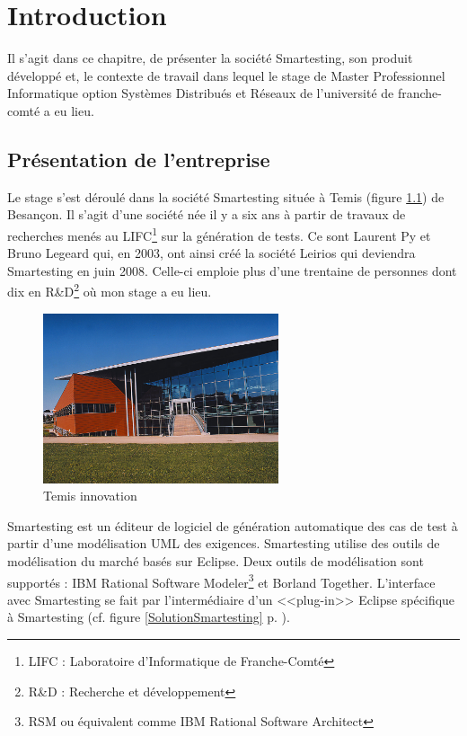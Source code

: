 \chapter{Introduction}

Il s'agit dans ce chapitre, de présenter la société Smartesting, son produit développé et, le contexte de travail dans lequel le stage de Master Professionnel Informatique option Systèmes Distribués et Réseaux de l'université de franche-comté a eu lieu.

\section{Présentation de l'entreprise}

Le stage s’est déroulé dans la société Smartesting située à Temis (figure \ref{Temis}) de Besançon. Il s'agit d'une société née il y a six ans à partir de travaux de recherches menés au LIFC\footnote{LIFC : Laboratoire d'Informatique de Franche-Comté} sur la génération de tests. 
Ce sont Laurent Py et Bruno Legeard qui, en 2003, ont ainsi créé la société Leirios qui deviendra  Smartesting en juin 2008.
Celle-ci emploie plus d'une trentaine de personnes dont dix en R\&D\footnote{R\&D : Recherche et développement} où mon stage a eu lieu.

\begin{figure}[!ht]
\begin{center}
  \includegraphics[height=5cm]{images/temis.jpg}
  \caption{Temis innovation}
  \label{Temis}
\end{center}
\end{figure}

Smartesting est un éditeur de logiciel de génération automatique des cas de test à partir d'une modélisation UML des exigences. Smartesting utilise des outils de modélisation du marché basés sur Eclipse. Deux outils de modélisation sont supportés : IBM Rational Software Modeler\footnote{RSM ou équivalent comme IBM Rational Software Architect} et Borland Together. L'interface avec Smartesting se fait par l'intermédiaire d'un <<plug-in>> Eclipse spécifique à Smartesting (cf. figure \ref{SolutionSmartesting} p. \pageref{SolutionSmartesting}).


